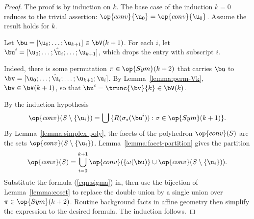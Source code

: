 \begin{proof} The proof is by induction on $k$.  The base case of the induction $k=0$
reduces to the trivial assertion: $\op{conv}\{\u_0\} = \op{conv}\{\u_0\}$.  Assume
the result holds for $k$.

Let $\bu=[\u_0;\ldots;\u_{k+1}]\in \bV(k+1)$.  For each $i$,  let
$\bu^i = [\u_0;\ldots;\hat\u_i;\ldots;\u_{k+1}]$, which drops the entry with subscript $i$.

  Indeed, there is some permutation
$\pi\in \op{Sym}(k+2)$ that carries $\bu$ to
$\bv=[\u_0;\ldots;\hat\u_i;\ldots;\u_{k+1};\u_i]$.  By
Lemma~\ref{lemma:perm-Vk}, $\bv\in \bV(k+1)$, so that $\bu^i =
\trunc{\bv}{k}\in \bV(k)$.

By the induction hypothesis 
\begin{equation}\label{eqn:sigma}
\op{conv}(S\setminus\{\u_i\}) = \bigcup \,\{ R(\sigma_*(\bu^i)) : \sigma\in \op{Sym}(k+1)\}.
\end{equation}
By Lemma~\ref{lemma:simplex-poly}, the facets of the polyhedron
$\op{conv}(S)$ are the sets $\op{conv}(S\setminus\{\u_i\})$.
Lemma~\ref{lemma:facet-partition} gives the partition
\begin{displaymath}
\op{conv}(S) = \bigcup_{i=0}^{k+1} \op{conv}(\{\omega(\bu)\}\cup \op{conv}(S\setminus\{\u_i\})).
\end{displaymath}
Substitute the formula (\ref{eqn:sigma}) in, then use the bijection of Lemma~\ref{lemma:coset} to replace the double union by a single union over $\pi\in \op{Sym}(k+2)$.  Routine background
facts in affine geometry then simplify the expression to the desired formula.
The induction follows.
%
%
%
\end{proof}



